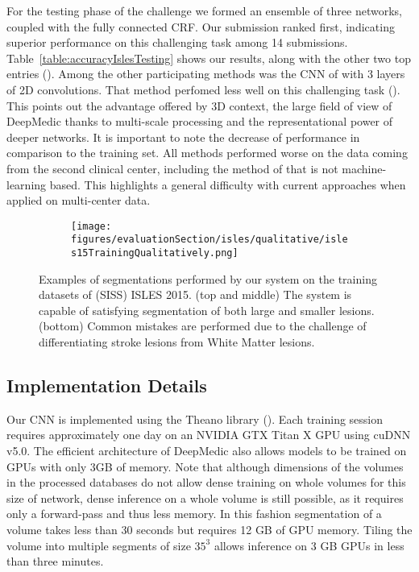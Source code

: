\documentclass[preprint,authoryear,12pt]{elsarticle}
\begin{document}
For the testing phase of the challenge we formed an ensemble of three networks, coupled with the fully connected CRF. Our submission ranked first, indicating superior performance on this challenging task among 14 submissions. Table~\ref{table:accuracyIslesTesting} shows our results, along with the other two top entries (\cite{feng2015Isles,halme2015Isles}). Among the other participating methods was the CNN of \cite{Havei2015Journal} with 3 layers of 2D convolutions. That method perfomed less well on this challenging task (\cite{maier2017isles}). This points out the advantage offered by 3D context, the large field of view of DeepMedic thanks to multi-scale processing and the representational power of deeper networks. It is important to note the decrease of performance in comparison to the training set. All methods performed worse on the data coming from the second clinical center, including the method of \cite{feng2015Isles} that is not machine-learning based. This highlights a general difficulty with current approaches when applied on multi-center data.

\begin{figure}[!h]
\centering
\begin{subfigure}[b]{1.0\textwidth}
	\centering
	\texttt{[image: figures/evaluationSection/isles/qualitative/isles15TrainingQualitatively.png]}
\end{subfigure}
\vspace{-0pt} \caption{Examples of segmentations performed by our system on the training datasets of (SISS) ISLES 2015. (top and middle) The system is capable of satisfying segmentation of both large and smaller lesions. (bottom) Common mistakes are performed due to the challenge of differentiating stroke lesions from White Matter lesions. }
\label{fig:evalIslesVisualQuality}
\end{figure}
%
 
\subsection{Implementation Details}
 
Our CNN is implemented using the Theano library (\cite{Bastien-Theano-2012}). Each training session requires approximately one day on an NVIDIA GTX Titan X GPU using cuDNN v5.0. The efficient architecture of DeepMedic also allows models to be trained on GPUs with only 3GB of memory. Note that although dimensions of the volumes in the processed databases do not allow dense training on whole volumes for this size of network, dense inference on a whole volume is still possible, as it requires only a forward-pass and thus less memory. In this fashion segmentation of a volume takes less than 30 seconds but requires 12 GB of GPU memory. Tiling the volume into multiple segments of size $35^3$ allows inference on 3 GB GPUs in less than three minutes.
\end{document}
